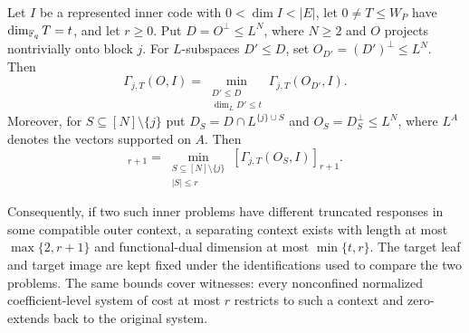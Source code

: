 \begin{theorem}
\label{prop:rank-bounded-outer-tests}
%
Let $I$ be a represented inner code with $0<\dim I<|E|$, let
$0\ne T\leq W_P$ have $\dim_{\mathbb F_q}T=t$, and let $r\geq0$.  Put
$D=O^\perp\leq L^N$, where $N\geq2$ and $O$ projects nontrivially onto block
$j$.  For $L$-subspaces $D'\leq D$, set $O_{D'}=(D')^\perp\leq L^N$.  Then
\begin{equation}
 \Gamma_{j,T}(O,I)=
 \min_{\substack{D'\leq D\\\dim_LD'\leq t}}
 \Gamma_{j,T}(O_{D'},I).
 \label{eq:rank-bounded-outer-tests}
\end{equation}
Moreover, for $S\subseteq[N]\setminus\{j\}$ put
$D_S=D\cap L^{\{j\}\cup S}$ and $O_S=D_S^\perp\leq L^N$, where $L^A$
denotes the vectors supported on $A$.  Then
\begin{equation}
 [\Gamma_{j,T}(O,I)]_{r+1}
 =\min_{\substack{S\subseteq[N]\setminus\{j\}\\|S|\leq r}}
   [\Gamma_{j,T}(O_S,I)]_{r+1}.
 \label{eq:radius-bounded-outer-tests}
\end{equation}

Consequently, if two such inner problems have different truncated responses
in some compatible outer context, a separating context exists with length at
most $\max\{2,r+1\}$ and functional-dual dimension at most
$\min\{t,r\}$.  The target leaf and target image are kept fixed under the
identifications used to compare the two problems.  The same bounds cover
witnesses: every nonconfined normalized coefficient-level system of cost at
most $r$ restricts to such a context and zero-extends back to the original
system.
\end{theorem}

